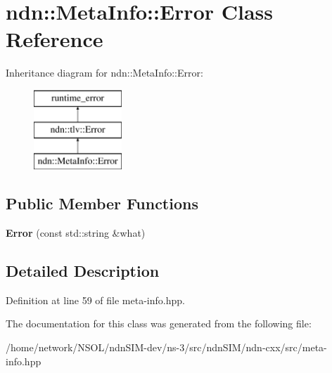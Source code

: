 \hypertarget{classndn_1_1MetaInfo_1_1Error}{}\section{ndn\+:\+:Meta\+Info\+:\+:Error Class Reference}
\label{classndn_1_1MetaInfo_1_1Error}
Inheritance diagram for ndn\+:\+:Meta\+Info\+:\+:Error\+:\begin{figure}[H]
\begin{center}
\leavevmode
\includegraphics[height=3.000000cm]{classndn_1_1MetaInfo_1_1Error}
\end{center}
\end{figure}
\subsection*{Public Member Functions}
\begin{DoxyCompactItemize}
\item 
{\bfseries Error} (const std\+::string \&what)\hypertarget{classndn_1_1MetaInfo_1_1Error_ad9d8b801c91aa7ea6be7a14137efdf50}{}\label{classndn_1_1MetaInfo_1_1Error_ad9d8b801c91aa7ea6be7a14137efdf50}

\end{DoxyCompactItemize}


\subsection{Detailed Description}


Definition at line 59 of file meta-\/info.\+hpp.



The documentation for this class was generated from the following file\+:\begin{DoxyCompactItemize}
\item 
/home/network/\+N\+S\+O\+L/ndn\+S\+I\+M-\/dev/ns-\/3/src/ndn\+S\+I\+M/ndn-\/cxx/src/meta-\/info.\+hpp\end{DoxyCompactItemize}
